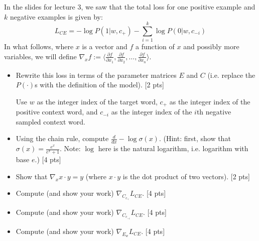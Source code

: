 \documentclass[11pt]{article}
\begin{document}
\vspace{2em}
  In the slides for lecture 3, we saw that the total loss for one positive example and $k$ negative examples is given by:
$$ L_{CE} = -\log P(1 | w, c_+) - \sum_{i=1}^k \log P(0 | w, c_{-i})$$
In what follows, where $x$ is a vector and $f$ a function of $x$ and possibly more variables, we will define $\nabla_x f := \langle \frac{\partial f}{\partial x_1} , \frac{\partial f}{\partial x_2}, \dots , \frac{\partial f}{\partial x_n} \rangle$.
\begin{itemize}
  \item Rewrite this loss in terms of the parameter matrices $E$ and $C$ (i.e. replace the $P(\cdot)$s with the definition of the model). [2 pts]

        Use $w$ as the integer index of the target word, $c_+$ as the integer index of the positive context word, and $c_{-i}$ as the integer index of the $i$th negative sampled context word.
  \item Using the chain rule, compute $\frac{d}{dx} -\log\sigma(x)$.  (Hint: first, show that $\sigma(x) = \frac{e^x}{e^x+1}$.  Note: $\log$ here is the natural logarithm, i.e. logarithm with base $e$.) [4 pts]
  \item Show that $\nabla_x x \cdot y = y$ (where $x \cdot y$ is the dot product of two vectors). [2 pts]
  \item Compute (and show your work) $\nabla_{C_{c_+}} L_{CE}$. [4 pts]
  \item Compute (and show your work) $\nabla_{C_{c_{-i}}} L_{CE}$. [4 pts]
  \item Compute (and show your work) $\nabla_{E_w} L_{CE}$. [4 pts]
\end{itemize}
\end{document}
